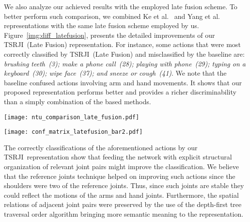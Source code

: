 \documentclass[10pt,conference]{IEEEtran}
\def\sigla{TSRJI}
\begin{document}
We also analyze our achieved results with the employed late fusion scheme. To better perform such comparison, we combined Ke et al.~\cite{Ke:2017} and Yang et al.~\cite{Yang:2018} representations with the same late fusion scheme employed by us. Figure~\ref{img:diff_latefusion}, presents the detailed improvements of our \sigla~(Late Fusion) representation. For instance, some actions that were most correctly classified by \sigla~(Late Fusion) and misclassified by the baseline are: \emph{brushing teeth~(3); make a phone call~(28); playing with phone~(29); typing on a keyboard~(30); wipe face~(37); and sneeze or cough~(41)}. We note that the baseline confused actions involving arm and hand movements. It shows that our proposed representation performs better and provides a richer discriminability than a simply combination of the based methods.

\begin{figure*}[!htb]
\centering
	\texttt{[image: ntu\_comparison\_late\_fusion.pdf]}
	\caption{Comparison of \sigla~(Late Fusion) with Ke et al.~\cite{Ke:2017} + Yang et al.~\cite{Yang:2018}~(Late Fusion) on NTU RGB+D~60~\cite{Shahroudy:2016} dataset for cross-view protocol. Best viewed in color.}
	\label{img:diff_latefusion}
\end{figure*}



\begin{figure*}[!htb]
\centering
	\texttt{[image: conf\_matrix\_latefusion\_bar2.pdf]}
	\caption{Confusion matrix of \sigla~(Late Fusion) on NTU RGB+D~60~\cite{Shahroudy:2016} dataset. Best viewed in color.}
	\label{img:confusion_matrix}
\end{figure*}



The correctly classifications of the aforementioned actions by our \sigla~representation show that feeding the network with explicit structural organization of relevant joint pairs might improve the classification. We believe that the reference joints technique helped on improving such actions since the shoulders were two of the reference joints. Thus, since such joints are stable they could reflect the motions of the arms and hand joints. Furthermore, the spatial relations of adjacent joint pairs were preserved by the use of the depth-first tree traversal order algorithm bringing more semantic meaning to the representation.
\end{document}
